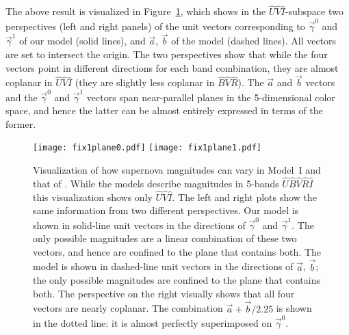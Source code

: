 \documentclass[trackchanges]{aastex62}   	%
\begin{document}
The above result is visualized in Figure~\ref{plane:fig}, which  shows  in the
${\hat{U}}{\hat{V}}\hat{I}$-subspace
two perspectives (left and right panels)
of the unit vectors corresponding to $\vec{\gamma}^0$ and  $\vec{\gamma}^1$ of our model (solid lines),
and $\vec{a}$, $\vec{b}$ of the  model (dashed lines).  All  vectors are set to intersect the origin.
The two perspectives show that while the four vectors point in different directions for each band combination,
they are almost coplanar in ${\hat{U}}{\hat{V}}{\hat{I}}$ (they are slightly less coplanar in ${\hat{B}}{\hat{V}}{\hat{R}}$).  The $\vec{a}$ and $\vec{b}$ vectors and the $\vec{\gamma}^0$ and $\vec{\gamma}^1$
vectors span near-parallel planes in the 5-dimensional color space, and hence the latter can be almost entirely expressed in terms of
the former.

\begin{figure}[htbp] %
   \centering
   \texttt{[image: fix1plane0.pdf]}
   \texttt{[image: fix1plane1.pdf]}
   \caption{
   Visualization of how supernova magnitudes can vary in Model~I and that of .  While the models describe
   magnitudes in 5-bands ${\hat{U}}{\hat{B}}{\hat{V}}{\hat{R}}{\hat{I}}$ this visualization shows only ${\hat{U}}{\hat{V}}{\hat{I}}$.   The left and right plots show the same information from
   two different perspectives.
   Our model is shown in solid-line unit vectors in the directions of $\vec{\gamma}^0$ and $\vec{\gamma}^1$. The only possible magnitudes
   are a linear combination of these two vectors, and hence are confined to the plane that contains both.
   The   model is shown in dashed-line unit vectors
   in the directions of  $\vec{a}$, $\vec{b}$; the only possible magnitudes are confined to the plane that contains both.
   The perspective on the right visually shows that all four vectors are nearly coplanar.  
   The combination $\vec{a}+\vec{b}/2.25$ is shown in the dotted 
   line: it is almost perfectly superimposed on $\vec{\gamma}^0$.
   \label{plane:fig}}
\end{figure}
\end{document}
